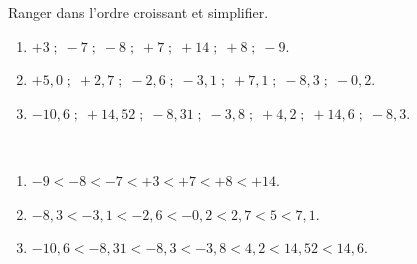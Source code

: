 \begin{exercice}
    Ranger dans l'ordre croissant et simplifier.
    {\baselineskip=7mm
    \begin{enumerate}
       \item $+3 \; ; \; -7 \;;\;-8 \;;\; +7 \;; \;+14\; ;\; +8 \;;\; -9$.
       \item $+5,0\; ; \;+2,7 \;;\; -2,6\; ; \;-3,1\; ; \;+7,1\; ; \;-8,3\; ;\; -0,2$.
       \item $-10,6 \;; \;+14,52\; ;\; -8,31 \;; \;-3,8 \;; \;+4,2 \;; \;+14,6\; ;\; -8,3$.
    \end{enumerate}}  
 \end{exercice}
 
 \begin{corrige}
    \ \\ [-7mm]
    {\baselineskip=7mm
    \begin{enumerate}
       \item \red $-9<-8<-7<+3<+7<+8<+14$.
       \item \red $-8,3<-3,1<-2,6<-0,2<2,7<5<7,1$.
       \item \red$-10,6<-8,31<-8,3<-3,8<4,2<14,52<14,6$.
    \end{enumerate}}  
 \end{corrige}